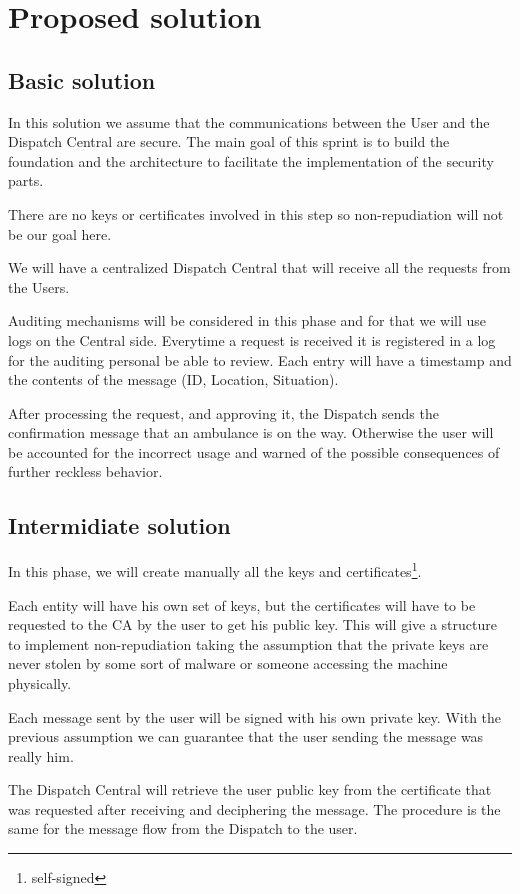 \documentclass[a4paper,titlepage,11pt]{article}
\begin{document}
\section{Proposed solution}

\subsection{Basic solution}
In this solution we assume that the communications between the User and the Dispatch Central are secure.
The main goal of this sprint is to build the foundation and the architecture to facilitate the implementation of the security parts.

There are no keys or certificates involved in this step so non-repudiation will not be our goal here.

We will have a centralized Dispatch Central that will receive all the requests from the Users.

Auditing mechanisms will be considered in this phase and for that we will use logs on the Central side.
Everytime a request is received it is registered in a log for the auditing personal be able to review.
Each entry will have a timestamp and the contents of the message (ID, Location, Situation).

After processing the request, and approving it, the Dispatch sends the confirmation message that an ambulance is on the way.
Otherwise the user will be accounted for the incorrect usage and warned of the possible consequences of further reckless behavior.

\subsection{Intermidiate solution}
In this phase, we will create manually all the keys and certificates\footnote{self-signed}.

Each entity will have his own set of keys, but the certificates will have to be requested to the CA by the user to get his public key.        %
This will give a structure to implement non-repudiation taking the assumption that the private keys are never stolen
by some sort of malware or someone accessing the machine physically.

Each message sent by the user will be signed with his own private key.
With the previous assumption we can guarantee that the user sending the message was really him.

The Dispatch Central will retrieve the user public key from the certificate that was requested after receiving and deciphering the message.   %
The procedure is the same for the message flow from the Dispatch to the user.
\end{document}
